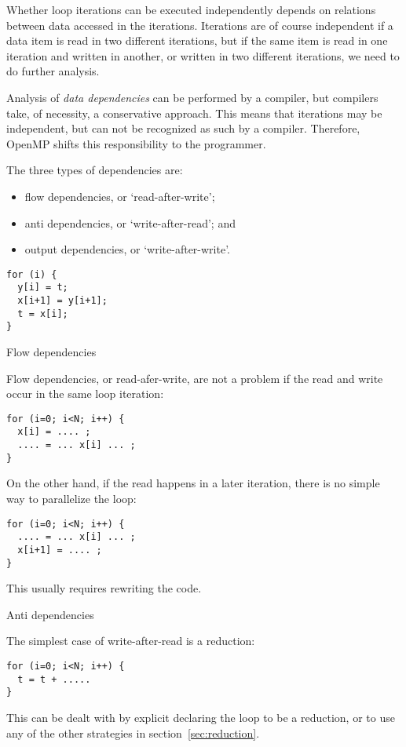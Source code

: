 Whether loop iterations can be executed independently
depends on relations between data accessed in the iterations.
Iterations are of course independent if a data item
is read in two different iterations, but if the same
item is read in one iteration and written in another,
or written in two different iterations,
we need to do further analysis.

Analysis of \emph{data dependencies} can be performed
by a compiler, but compilers take, of necessity,
a conservative approach. This means that iterations
may be independent, but can not be recognized as such by
a compiler. Therefore, OpenMP shifts this responsibility
to the programmer.

The three types of dependencies are:
\begin{itemize}
\item flow dependencies, or `read-after-write';
\item anti dependencies, or `write-after-read'; and
\item output dependencies, or `write-after-write'.
\end{itemize}

\begin{verbatim}
for (i) {
  y[i] = t;
  x[i+1] = y[i+1];
  t = x[i];
}
\end{verbatim}

 {Flow dependencies}

Flow dependencies, or read-afer-write,
are not a problem if the read and write occur in the same
loop iteration:
\begin{verbatim}
for (i=0; i<N; i++) {
  x[i] = .... ;
  .... = ... x[i] ... ;
}
\end{verbatim}
On the other hand, if the read happens in a later iteration,
there is no simple way to parallelize the loop:
\begin{verbatim}
for (i=0; i<N; i++) {
  .... = ... x[i] ... ;
  x[i+1] = .... ;
}
\end{verbatim}
This usually requires rewriting the code.

 {Anti dependencies}

The simplest case of write-after-read is a reduction:
\begin{verbatim}
for (i=0; i<N; i++) {
  t = t + .....
}
\end{verbatim}
This can be dealt with by explicit declaring the loop to be a reduction,
or to use any of the other strategies in section~\ref{sec:reduction}.

